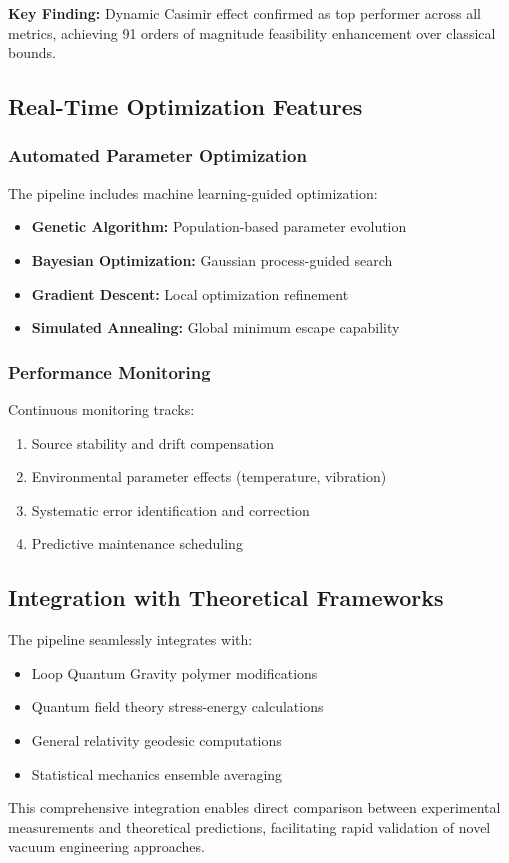 \documentclass[11pt]{article}
\begin{document}
\textbf{Key Finding:} Dynamic Casimir effect confirmed as top performer across all metrics, achieving 91 orders of magnitude feasibility enhancement over classical bounds.

\subsection*{Real-Time Optimization Features}

\subsubsection*{Automated Parameter Optimization}
The pipeline includes machine learning-guided optimization:
\begin{itemize}
  \item \textbf{Genetic Algorithm:} Population-based parameter evolution
  \item \textbf{Bayesian Optimization:} Gaussian process-guided search
  \item \textbf{Gradient Descent:} Local optimization refinement
  \item \textbf{Simulated Annealing:} Global minimum escape capability
\end{itemize}

\subsubsection*{Performance Monitoring}
Continuous monitoring tracks:
\begin{enumerate}
  \item Source stability and drift compensation
  \item Environmental parameter effects (temperature, vibration)
  \item Systematic error identification and correction
  \item Predictive maintenance scheduling
\end{enumerate}

\subsection*{Integration with Theoretical Frameworks}

The pipeline seamlessly integrates with:
\begin{itemize}
  \item Loop Quantum Gravity polymer modifications
  \item Quantum field theory stress-energy calculations
  \item General relativity geodesic computations
  \item Statistical mechanics ensemble averaging
\end{itemize}

This comprehensive integration enables direct comparison between experimental measurements and theoretical predictions, facilitating rapid validation of novel vacuum engineering approaches.
\end{document}
